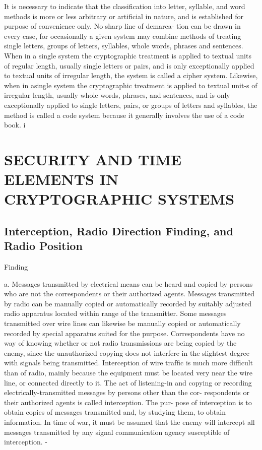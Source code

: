 It is necessary to indicate that the classiﬁcation into letter, syllable,
and word methods is more or less arbitrary or artiﬁcial in nature, and is
established for purpose of convenience only. No sharp line of demarca-
tion can be drawn in every case, for occasionally a given system may
combine methods of treating single letters, groups of letters, syllables,
whole words, phrases and sentences. When in a single system the
cryptographic treatment is applied to textual units of regular length,
usually single letters or pairs, and is only exceptionally applied to textual
units of irregular length, the system is called a cipher system. Likewise,
when in asingle system the cryptographic treatment is applied to textual
unit-s of irregular length, usually whole words, phrases, and sentences,
and is only exceptionally applied to single letters, pairs, or groups of
letters and syllables, the method is called a code system because it
generally involves the use of a code book. i

 

\section{SECURITY AND TIME ELEMENTS IN CRYPTOGRAPHIC SYSTEMS}

\subsection{Interception, Radio Direction Finding, and Radio Position}
Finding

a. Messages transmitted by electrical means can be heard and copied
by persons who are not the correspondents or their authorized agents.
Messages transmitted by radio can be manually copied or automatically
recorded by suitably adjusted radio apparatus located within range of the
transmitter. Some messages transmitted over wire lines can likewise be
manually copied or automatically recorded by special apparatus suited
for the purpose. Correspondents have no way of knowing whether or not
radio transmissions are being copied by the enemy, since the unauthorized
copying does not interfere in the slightest degree with signals being
transmitted. Interception of wire trafﬁc is much more difficult than of
radio, mainly because the equipment must be located very near the wire
line, or connected directly to it. The act of listening-in and copying or
recording electrically-transmitted messages by persons other than the cor-
respondents or their authorized agents is called interception. The pur-
pose of interception is to obtain copies of messages transmitted and, by
studying them, to obtain information. In time of war, it must be assumed
that the enemy will intercept all messages transmitted by any signal
communication agency susceptible of interception. -


